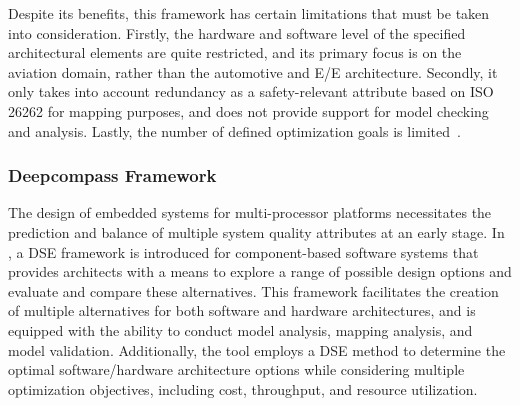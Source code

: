 
Despite its benefits, this framework has certain limitations that must be taken into consideration. Firstly, the hardware and software level of the specified architectural elements are quite restricted, and its primary focus is on the aviation domain, rather than the automotive and E/E architecture. Secondly, it only takes into account redundancy as a safety-relevant attribute based on ISO 26262 for mapping purposes, and does not provide support for model checking and analysis. Lastly, the number of defined optimization goals is limited~\cite{askaripoor2022architecture}.




\subsubsection{Deepcompass Framework}
The design of embedded systems for multi-processor platforms necessitates the prediction and balance of multiple system quality attributes at an early stage. In \cite{bondarev2007exploring}, a DSE framework is introduced for component-based software systems that provides architects with a means to explore a range of possible design options and evaluate and compare these alternatives. This framework facilitates the creation of multiple alternatives for both software and hardware architectures, and is equipped with the ability to conduct model analysis, mapping analysis, and model validation.
Additionally, the tool employs a DSE method to determine the optimal software/hardware architecture options while considering multiple optimization objectives, including cost, throughput, and resource utilization.

